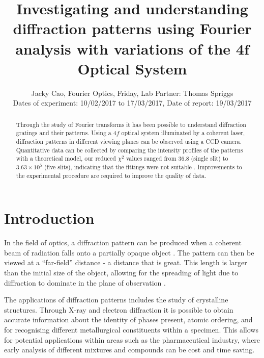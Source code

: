 \documentclass[twocolumn]{revtex4}
\begin{document}
\textheight=26.385cm

\title{Investigating and understanding diffraction patterns using Fourier analysis with variations of the $\boldsymbol{4f}$ Optical System}
 
\author{Jacky Cao, Fourier Optics, Friday, Lab Partner: Thomas Spriggs \\ Dates of experiment: 10/02/2017 to 17/03/2017, Date of report: 19/03/2017}

\begin{abstract}              
Through the study of Fourier transforms it has been possible to understand diffraction gratings and their patterns. Using a $4f$ optical system illuminated by a coherent laser, diffraction patterns in different viewing planes can be observed using a CCD camera. Quantitative data can be collected by comparing the intensity profiles of the patterns with a theoretical model, our reduced $\chi^2$ values ranged from 36.8 (single slit) to $3.63\times10^5$ (five slits), indicating that the fittings were not suitable \cite{hughesandhayes}. Improvements to the experimental procedure are required to improve the quality of data. 
\end{abstract}

\maketitle

\section{Introduction} 
\vspace{-2ex} 

In the field of optics, a diffraction pattern can be produced when a coherent beam of radiation falls onto a partially opaque object \cite{mathmethods}. The pattern can then be viewed at a ``far-field'' distance - a distance that is great. This length is larger than the initial size of the object, allowing for the spreading of light due to diffraction to dominate in the  plane of observation \cite{of2f}. 

The applications of diffraction patterns includes the study of crystalline structures. Through X-ray and electron diffraction it is possible to obtain accurate information about the identity of phases present, atomic ordering, and for recognising different metallurgical constituents within a specimen. This allows for potential applications within areas such as the pharmaceutical industry, where early analysis of different mixtures and compounds can be cost and time saving. \cite{elecdiffraction, xraypharma}
\end{document}
